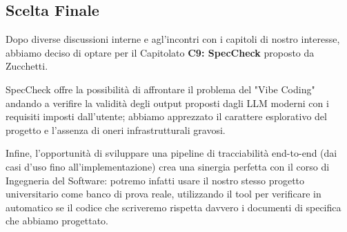 \documentclass[a4paper, 11pt]{article}
\begin{document}
\subsection{Scelta Finale}

Dopo diverse discussioni interne e agl'incontri con i capitoli di nostro interesse, abbiamo deciso di optare per il Capitolato \textbf{C9: SpecCheck} proposto da Zucchetti.

SpecCheck offre la possibilità di affrontare il problema del "Vibe Coding" andando a verifire la validità degli output proposti dagli LLM moderni con i requisiti imposti dall'utente; abbiamo apprezzato il carattere esplorativo del progetto e l'assenza di oneri infrastrutturali gravosi.  

Infine, l'opportunità di sviluppare una pipeline di tracciabilità end-to-end (dai casi d'uso fino all'implementazione) crea una sinergia perfetta con il corso di Ingegneria del Software: potremo infatti usare il nostro stesso progetto universitario come banco di prova reale, utilizzando il tool per verificare in automatico se il codice che scriveremo rispetta davvero i documenti di specifica che abbiamo progettato.
\end{document}
